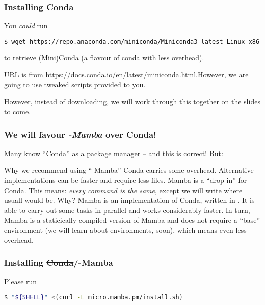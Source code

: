 \begin{frame}[fragile]
  \frametitle{Installing Conda}
  You \emph{could} run
  \begin{lstlisting}[language=Bash, style=Shell, basicstyle=\small,breaklines=true ]
$ wget https://repo.anaconda.com/miniconda/Miniconda3-latest-Linux-x86_64.sh
  \end{lstlisting}
  to retrieve (Mini)Conda (a flavour of conda with less overhead).
  \begin{hint}
  	\footnotesize URL is from \url{https://docs.conda.io/en/latest/miniconda.html}.\newline However, we are going to use tweaked scripts provided to you.
  \end{hint}
  \pause
  \begin{hint}
  	However, instead of downloading, we will work through this together on the slides to come.
  \end{hint}
\end{frame} 

\begin{frame}[fragile]
  \frametitle{We will favour \emph{\textmu-Mamba} over Conda!}
  Many know ``Conda'' as a package manager -- and this is correct! But:
  \begin{block}{Why we recommend using ``\textmu-Mamba''}
   Conda carries some overhead. Alternative implementations can be faster and require less files. Mamba is a ``drop-in'' for Conda. This means: \emph{every command is the same}, except we will write  where usuall  would be.\newline
   Why?\newline
   Mamba is an implementation of Conda, written in \CC{}. It is able to carry out some tasks in parallel and works considerably faster. In turn, \textmu-Mamba is a staticically compiled version of Mamba and does not require a ``base'' environment (we will learn about environments, soon), which means even less overhead.
  \end{block}
\end{frame}

\begin{frame}[fragile]
	\frametitle{Installing \sout{Conda}/\textmu-Mamba}
	Please run
	\begin{lstlisting}[language=Bash, style=Shell]
$ "${SHELL}" <(curl -L micro.mamba.pm/install.sh)
	\end{lstlisting}
\end{frame}

